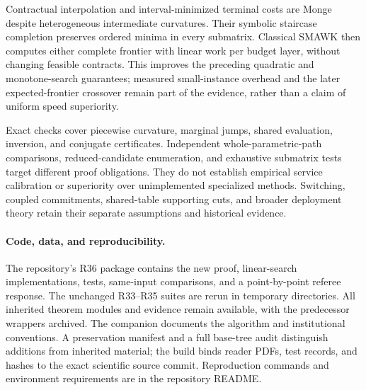 \documentclass[11pt,letterpaper]{article}
\theoremstyle{definition}\newtheorem{assumption}[theorem]{Assumption}
\begin{document}
Contractual interpolation and interval-minimized terminal costs are Monge despite heterogeneous intermediate curvatures. Their symbolic staircase completion preserves ordered minima in every submatrix. Classical SMAWK then computes either complete frontier with linear work per budget layer, without changing feasible contracts. This improves the preceding quadratic and monotone-search guarantees; measured small-instance overhead and the later expected-frontier crossover remain part of the evidence, rather than a claim of uniform speed superiority.

Exact checks cover piecewise curvature, marginal jumps, shared evaluation, inversion, and conjugate certificates. Independent whole-parametric-path comparisons, reduced-candidate enumeration, and exhaustive submatrix tests target different proof obligations. They do not establish empirical service calibration or superiority over unimplemented specialized methods. Switching, coupled commitments, shared-table supporting cuts, and broader deployment theory retain their separate assumptions and historical evidence.

\paragraph{Code, data, and reproducibility.}
The repository's R36 package contains the new proof, linear-search implementations, tests, same-input comparisons, and a point-by-point referee response. The unchanged R33--R35 suites are rerun in temporary directories. All inherited theorem modules and evidence remain available, with the predecessor wrappers archived. The companion documents the algorithm and institutional conventions. A preservation manifest and a full base-tree audit distinguish additions from inherited material; the build binds reader PDFs, test records, and hashes to the exact scientific source commit. Reproduction commands and environment requirements are in the repository README.
\clearpage
{}\label{r36-refs-start}

\label{r36-refs-end}
\clearpage





\end{document}
